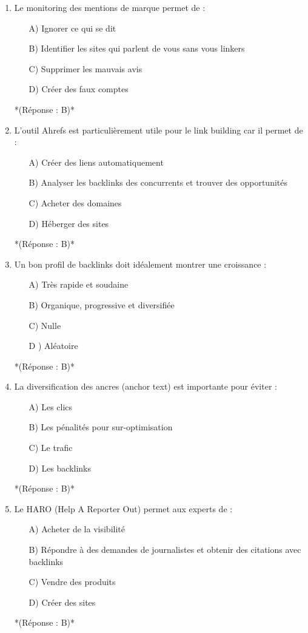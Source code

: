 \documentclass[12pt,a4paper,twoside]{report}
\begin{document}
\begin{enumerate}
\item Le monitoring des mentions de marque permet de :
\begin{itemize}
\item[A)] Ignorer ce qui se dit
\item[B)] Identifier les sites qui parlent de vous sans vous linkers
\item[C)] Supprimer les mauvais avis
\item[D)] Créer des faux comptes
\end{itemize}
*(Réponse : B)*

\item L'outil Ahrefs est particulièrement utile pour le link building car il permet de :
\begin{itemize}
\item[A)] Créer des liens automatiquement
\item[B)] Analyser les backlinks des concurrents et trouver des opportunités
\item[C)] Acheter des domaines
\item[D)] Héberger des sites
\end{itemize}
*(Réponse : B)*

\item Un bon profil de backlinks doit idéalement montrer une croissance :
\begin{itemize}
\item[A)] Très rapide et soudaine
\item[B)] Organique, progressive et diversifiée
\item[C)] Nulle
\item[D]) Aléatoire
\end{itemize}
*(Réponse : B)*

\item La diversification des ancres (anchor text) est importante pour éviter :
\begin{itemize}
\item[A)] Les clics
\item[B)] Les pénalités pour sur-optimisation
\item[C)] Le trafic
\item[D)] Les backlinks
\end{itemize}
*(Réponse : B)*

\item Le HARO (Help A Reporter Out) permet aux experts de :
\begin{itemize}
\item[A)] Acheter de la visibilité
\item[B)] Répondre à des demandes de journalistes et obtenir des citations avec backlinks
\item[C)] Vendre des produits
\item[D)] Créer des sites
\end{itemize}
*(Réponse : B)*


\end{enumerate}
\end{document}
